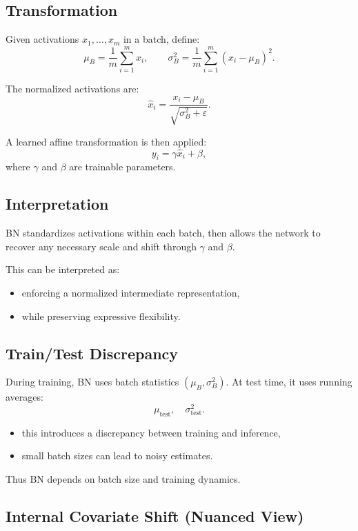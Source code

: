\subsection{Transformation}

Given activations $x_1,\dots,x_m$ in a batch, define:
\[
\mu_B = \frac{1}{m}\sum_{i=1}^m x_i,
\qquad
\sigma_B^2 = \frac{1}{m}\sum_{i=1}^m (x_i - \mu_B)^2.
\]

The normalized activations are:
\[
\hat{x}_i = \frac{x_i - \mu_B}{\sqrt{\sigma_B^2 + \varepsilon}}.
\]

A learned affine transformation is then applied:
\[
y_i = \gamma \hat{x}_i + \beta,
\]
where $\gamma$ and $\beta$ are trainable parameters.

\subsection{Interpretation}

BN standardizes activations within each batch, then allows the network to recover any necessary scale and shift through $\gamma$ and $\beta$.

This can be interpreted as:
\begin{itemize}
    \item enforcing a normalized intermediate representation,
    \item while preserving expressive flexibility.
\end{itemize}

\subsection{Train/Test Discrepancy}

During training, BN uses batch statistics $(\mu_B, \sigma_B^2)$.  
At test time, it uses running averages:
\[
\mu_{\mathrm{test}}, \quad \sigma^2_{\mathrm{test}}.
\]

\begin{itemize}
    \item this introduces a discrepancy between training and inference,
    \item small batch sizes can lead to noisy estimates.
\end{itemize}

Thus BN depends on batch size and training dynamics.

\subsection{Internal Covariate Shift (Nuanced View)}

